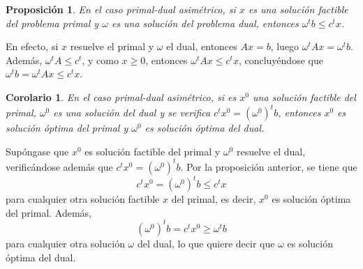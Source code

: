 \documentclass[11pt]{report}
\makeatletter
\renewenvironment{proof}[1][\proofname]{\par
  \pushQED{\qed}%
  \normalfont \topsep\z@skip %
  \trivlist
  \item[\hskip\labelsep
        \itshape
    #1\@addpunct{.}]\ignorespaces
}{%
  \popQED\endtrivlist\@endpefalse
}
\theoremstyle{mytheorem}
\newtheorem{proposition}{Proposición}
\newtheorem{corollary}{Corolario} %
\theoremstyle{mydefinition}
\theoremstyle{myexample}
\let\oldproofname=\proofname
\renewcommand{\proofname}{\rm\bf{\oldproofname}}}
\newenvironment{cproposition} %
  {\begin{mdframed}[
        linewidth=3pt,
        linecolor=c2,
        bottomline=false,
        topline=false,
        rightline=false,
        innerrightmargin=0pt,
        innertopmargin=0pt,
        innerbottommargin=0pt,
        innerleftmargin=1em,
        skipabove=\baselineskip]
    \begin{proposition}}
  {\end{proposition}\end{mdframed}}
\newenvironment{ccorollary} %
  {\begin{mdframed}[
        linewidth=3pt,
        linecolor=c2,
        bottomline=false,
        topline=false,
        rightline=false,
        innerrightmargin=0pt,
        innertopmargin=0pt,
        innerbottommargin=0pt,
        innerleftmargin=1em,
        skipabove=\baselineskip]
    \begin{corollary}}
  {\end{corollary}\end{mdframed}}
\makeatother
\begin{document}
\pagebreak

\begin{cproposition}
\label{prop3.2.}
En el caso primal-dual asimétrico, si $x$ es una solución factible del problema primal y $\omega$ es una solución del problema dual, entonces $\omega^t b \leq c^tx$.
\end{cproposition}

\begin{proof}
En efecto, si $x$ resuelve el primal y $\omega$ el dual, entonces $Ax=b$, luego $\omega^t Ax=\omega^t b$. Además, $\omega^t A \leq c^t$, y como $x \geq 0$, entonces $\omega^t A x \leq c^tx$, concluyéndose que
$\omega^t b = \omega^t Ax \leq c^tx$.
\end{proof}

\begin{ccorollary}
\label{cor3.1.}
En el caso primal-dual asimétrico, si es $x^0$ una solución factible del primal, $\omega^0$ es una solución del dual y se verifica $c^tx^0 = (\omega^0)^tb$, entonces $x^0$ es solución óptima del primal y $\omega^0$ es solución óptima del dual.
\end{ccorollary}

\begin{proof}
Supóngase que $x^0$ es solución factible del primal y $\omega^0$ resuelve el dual, verificándose además que $c^tx^0 = (\omega^0)^tb$. Por la proposición anterior, se tiene que
\[c^tx^0 = (\omega^0)^tb \leq c^tx\]
para cualquier otra solución factible $x$ del primal, es decir, $x^0$ es solución óptima del primal. Además,
\[(\omega^0)^tb = c^tx^0 \geq \omega^t b\]
para cualquier otra solución $\omega$ del dual, lo que quiere decir que $\omega$ es solución óptima del dual.
\end{proof}
\end{document}
